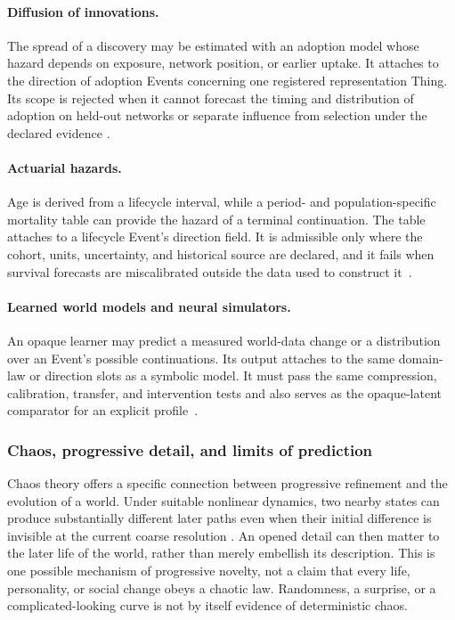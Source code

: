 \documentclass[10pt]{article}
\begin{document}
\paragraph{Diffusion of innovations.}
The spread of a discovery may be estimated with an adoption model whose hazard
depends on exposure, network position, or earlier uptake. It attaches to the
direction of adoption Events concerning one registered representation Thing. Its scope is rejected when it cannot
forecast the timing and distribution of adoption on held-out networks or
separate influence from selection under the declared evidence
\cite{bass1969,aral2009,manski1993}.

\paragraph{Actuarial hazards.}
Age is derived from a lifecycle interval, while a period- and population-specific
mortality table can provide the hazard of a terminal continuation. The table
attaches to a lifecycle Event's direction field. It is
admissible only where the cohort, units, uncertainty, and historical source are
declared, and it fails when survival forecasts are miscalibrated outside the
data used to construct it~\cite{dicksonHardyWaters2020}.

\paragraph{Learned world models and neural simulators.}
An opaque learner may predict a measured world-data change or a distribution
over an Event's possible continuations. Its output attaches to the same
domain-law or direction slots as a symbolic model. It must pass the same compression, calibration,
transfer, and intervention tests and also serves as the opaque-latent comparator
for an explicit profile~\cite{haSchmidhuber2018worldModels,
hafner2025dreamer,schrittwieser2020muzero}.

\subsubsection{Chaos, progressive detail, and limits of prediction}

Chaos theory offers a specific connection between progressive refinement and
the evolution of a world. Under suitable nonlinear dynamics, two nearby
states can produce substantially different later paths even when their
initial difference is invisible at the current coarse resolution
\cite{lorenz1963deterministic,may1974populations}. An opened detail can then
matter to the later life of the world, rather than merely embellish its
description. This is one possible mechanism of progressive novelty, not a
claim that every life, personality, or social change obeys a chaotic law.
Randomness, a surprise, or a complicated-looking curve is not by itself
evidence of deterministic chaos.
\end{document}
